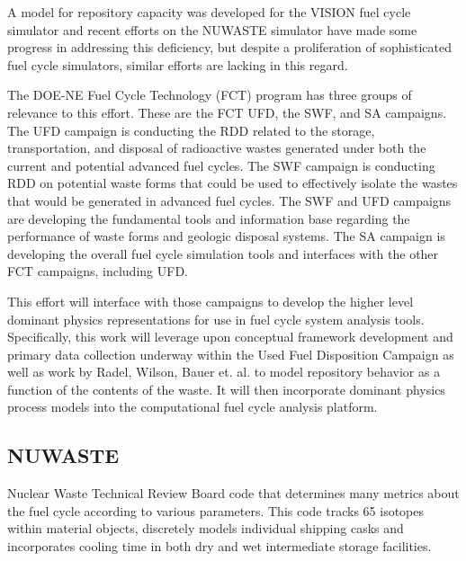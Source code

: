 A model for repository capacity was developed for the \gls{VISION} fuel cycle
simulator \cite{yacout_visionverifiable_2006} \cite{radel_repository_2007} and
recent efforts on the NUWASTE simulator \cite{ abkowitz_nuclear_2010} have made
some progress in addressing this deficiency, but despite a proliferation of
sophisticated fuel cycle simulators, similar efforts are lacking in this
regard. 


The DOE-NE Fuel Cycle Technology (FCT) program has three groups of relevance to 
this effort.  These are the \gls{FCT} \gls{UFD}, the \gls{SWF}, and \gls{SA} 
campaigns.  The \gls{UFD} campaign is conducting the \gls{RDD} related to the 
storage, transportation, and disposal of radioactive wastes generated under both 
the current and potential advanced fuel cycles.  The SWF campaign is conducting 
\gls{RDD} on potential waste forms that could be used to effectively isolate 
the wastes that would be generated in advanced fuel cycles.  The \gls{SWF} and
\gls{UFD} campaigns are developing the fundamental tools and information base 
regarding the performance of waste forms and geologic disposal systems.  The 
\gls{SA} campaign is developing the overall fuel cycle simulation tools and 
interfaces with the other FCT campaigns, including \gls{UFD}.  

This effort will interface with those campaigns to develop the higher level
dominant physics representations for use in fuel cycle system analysis tools.
Specifically, this work will leverage upon conceptual framework development and
primary data collection underway within the Used Fuel Disposition Campaign as
well as work by Radel, Wilson, Bauer et. al. to model repository behavior as a
function of the contents of the waste.  It will then incorporate dominant
physics process models into the \Cyclus computational fuel cycle analysis
platform.





\clearpage

\subsection{NUWASTE} Nuclear Waste Technical Review Board code that determines
many metrics about the fuel cycle according to various parameters.
\cite{abkowitz_nuclear_2010} This code tracks 65 isotopes within material
objects, discretely models individual shipping casks and incorporates cooling
time in both dry and wet intermediate storage facilities.

